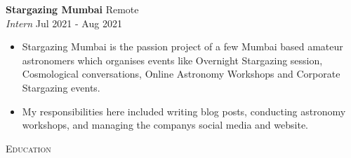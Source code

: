 \documentclass[a4paper]{article}
\newcommand{\lineunder} {
    \vspace*{-8pt} \\
    \hspace*{-18pt} \hrulefill \\
}
\newcommand{\header} [1] {
    {\hspace*{-18pt}\vspace*{6pt} \textsc{#1}}
    \vspace*{-6pt} \lineunder
}
\begin{document}
\textbf{Stargazing Mumbai} \hfill Remote\\
\textit{Intern} \hfill Jul 2021 - Aug 2021\\
\vspace{-1mm}
\begin{itemize} \itemsep 1pt
	\item Stargazing Mumbai is the passion project of a few Mumbai based amateur astronomers which organises events like Overnight Stargazing session, Cosmological conversations, Online Astronomy Workshops and Corporate Stargazing events.
	\item My responsibilities here included writing blog posts, conducting astronomy workshops, and managing the company\textquotesingle{}s social media and website.
\end{itemize}

\header{Education}
\vspace{1mm}
\end{document}
